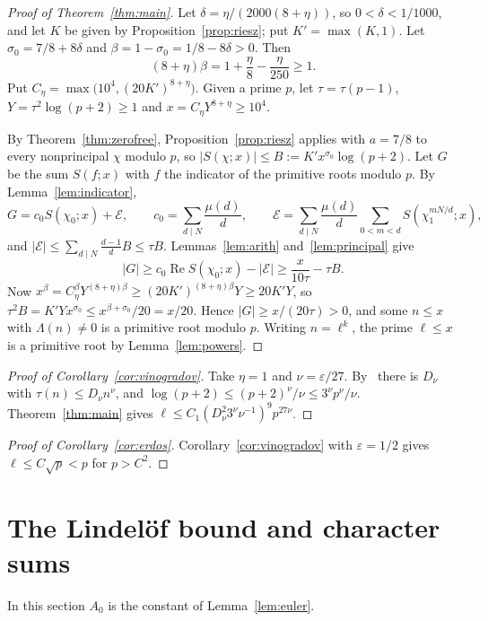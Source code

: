 \documentclass[12pt]{amsart}
\theoremstyle{remark}
\renewcommand{\Re}{\operatorname{Re}}
\begin{document}
\begin{proof}[Proof of Theorem~\ref{thm:main}]
Let $\delta=\eta/(2000(8+\eta))$, so $0<\delta<1/1000$, and let $K$ be given by
Proposition~\ref{prop:riesz}; put $K'=\max(K,1)$. Let $\sigma_0=7/8+8\delta$ and
$\beta=1-\sigma_0=1/8-8\delta>0$. Then
\[
  (8+\eta)\beta=1+\frac\eta8-\frac\eta{250}\ge1.
\]
Put $C_\eta=\max\bigl(10^4,(20K')^{8+\eta}\bigr)$. Given a prime $p$, let $\tau=\tau(p-1)$,
$Y=\tau^2\log(p+2)\ge1$ and $x=C_\eta Y^{8+\eta}\ge10^4$.

By Theorem~\ref{thm:zerofree}, Proposition~\ref{prop:riesz} applies with $a=7/8$ to every
nonprincipal $\chi$ modulo $p$, so $|S(\chi;x)|\le B:=K'x^{\sigma_0}\log(p+2)$. Let $G$ be the sum
$S(f;x)$ with $f$ the indicator of the primitive roots modulo $p$. By Lemma~\ref{lem:indicator},
\[
  G=c_0S(\chi_0;x)+\mathcal E,\qquad c_0=\sum_{d\mid N}\frac{\mu(d)}d,\qquad
  \mathcal E=\sum_{d\mid N}\frac{\mu(d)}d\sum_{0<m<d}S(\chi_1^{mN/d};x),
\]
and $|\mathcal E|\le\sum_{d\mid N}\frac{d-1}dB\le\tau B$. Lemmas~\ref{lem:arith}
and~\ref{lem:principal} give
\[
  |G|\ge c_0\Re S(\chi_0;x)-|\mathcal E|\ge\frac x{10\tau}-\tau B.
\]
Now $x^\beta=C_\eta^\beta Y^{(8+\eta)\beta}\ge(20K')^{(8+\eta)\beta}Y\ge20K'Y$, so
$\tau^2B=K'Yx^{\sigma_0}\le x^{\beta+\sigma_0}/20=x/20$. Hence $|G|\ge x/(20\tau)>0$, and some
$n\le x$ with $\Lambda(n)\ne0$ is a primitive root modulo $p$. Writing $n=\ell^k$, the prime
$\ell\le x$ is a primitive root by Lemma~\ref{lem:powers}.
\end{proof}

\begin{proof}[Proof of Corollary~\ref{cor:vinogradov}]
Take $\eta=1$ and $\nu=\varepsilon/27$. By~\cite[Thm.~315]{HW} there is $D_\nu$ with
$\tau(n)\le D_\nu n^\nu$, and $\log(p+2)\le(p+2)^\nu/\nu\le3^\nu p^\nu/\nu$. Theorem~\ref{thm:main}
gives $\ell\le C_1(D_\nu^2 3^\nu\nu^{-1})^9p^{27\nu}$.
\end{proof}

\begin{proof}[Proof of Corollary~\ref{cor:erdos}]
Corollary~\ref{cor:vinogradov} with $\varepsilon=1/2$ gives $\ell\le C\sqrt p<p$ for
$p>C^2$.
\end{proof}

\section{The Lindel\"of bound and character sums}\label{sec:charsum}

In this section $A_0$ is the constant of Lemma~\ref{lem:euler}.
\end{document}
